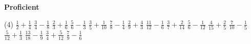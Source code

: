 \documentclass[17pt,a4paper,landscape]{extarticle}
\begin{document}
\sffamily
\boldmath

\boldmath

{\LARGE \textbf{Proficient}}
\begin{tasks}(4)
\task \mbox{$\frac{1}{2}+\frac{1}{4}$}
\task \mbox{$\frac{3}{4}-\frac{1}{8}$}
\task \mbox{$\frac{2}{3}+\frac{1}{6}$}
\task \mbox{$\frac{5}{6}-\frac{1}{3}$}
\task \mbox{$\frac{3}{5}+\frac{1}{10}$}
\task \mbox{$\frac{7}{8}-\frac{1}{4}$}
\task \mbox{$\frac{2}{9}+\frac{4}{3}$}
\task \mbox{$\frac{11}{12}-\frac{1}{6}$}
\task \mbox{$\frac{3}{7}+\frac{2}{14}$}
\task \mbox{$\frac{5}{6}-\frac{1}{12}$}
\task \mbox{$\frac{4}{15}+\frac{2}{5}$}
\task \mbox{$\frac{7}{10}-\frac{1}{5}$}
\task \mbox{$\frac{5}{12}+\frac{1}{3}$}
\task \mbox{$\frac{13}{18}-\frac{1}{9}$}
\task \mbox{$\frac{3}{4}+\frac{5}{12}$}
\task \mbox{$\frac{7}{9}-\frac{1}{6}$}
\end{tasks}
\end{document}
